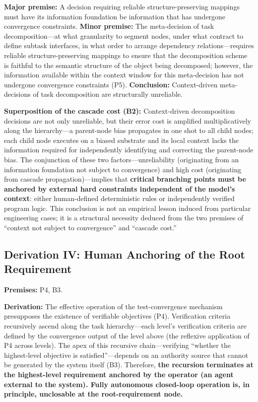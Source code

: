 \documentclass[11pt,a4paper]{article}
\theoremstyle{definition}
\begin{document}
\textbf{Major premise:} A decision requiring reliable structure-preserving mappings must have its information foundation be information that has undergone convergence constraints.
\textbf{Minor premise:} The meta-decision of task decomposition---at what granularity to segment nodes, under what contract to define subtask interfaces, in what order to arrange dependency relations---requires reliable structure-preserving mappings to ensure that the decomposition scheme is faithful to the semantic structure of the object being decomposed; however, the information available within the context window for this meta-decision has not undergone convergence constraints (P5).
\textbf{Conclusion:} Context-driven meta-decisions of task decomposition are structurally unreliable.

\textbf{Superposition of the cascade cost (B2):} Context-driven decomposition decisions are not only unreliable, but their error cost is amplified multiplicatively along the hierarchy---a parent-node bias propagates in one shot to all child nodes; each child node executes on a biased substrate and its local context lacks the information required for independently identifying and correcting the parent-node bias. The conjunction of these two factors---unreliability (originating from an information foundation not subject to convergence) and high cost (originating from cascade propagation)---implies that \textbf{critical branching points must be anchored by external hard constraints independent of the model's context}: either human-defined deterministic rules or independently verified program logic. This conclusion is not an empirical lesson induced from particular engineering cases; it is a structural necessity deduced from the two premises of ``context not subject to convergence'' and ``cascade cost.''

\subsection{Derivation IV: Human Anchoring of the Root Requirement}

\textbf{Premises:} P4, B3.

\textbf{Derivation:} The effective operation of the test-convergence mechanism presupposes the existence of verifiable objectives (P4). Verification criteria recursively ascend along the task hierarchy---each level's verification criteria are defined by the convergence output of the level above (the reflexive application of P4 across levels). The apex of this recursive chain---verifying ``whether the highest-level objective is satisfied''---depends on an authority source that cannot be generated by the system itself (B3). Therefore, \textbf{the recursion terminates at the highest-level requirement anchored by the operator (an agent external to the system). Fully autonomous closed-loop operation is, in principle, unclosable at the root-requirement node.}
\end{document}
